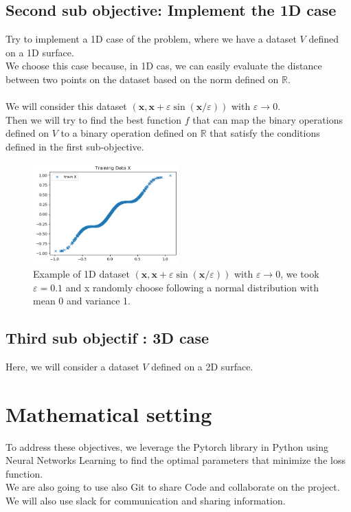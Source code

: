 \documentclass{report}
\begin{document}
        \subsection*{Second sub objective: Implement the 1D case}
            Try to implement a 1D case of the problem, where we have a dataset $V$ defined on a 1D surface.
            \\ 
            We choose this case because, in 1D cas, we can easily evaluate the distance between two points on the dataset based on the norm defined on $\mathbb{R}$.
            \\
            \\
            We will consider this dataset 
            $(\mathbf{x}, \mathbf{x}+\varepsilon \sin (\mathbf{x} / \varepsilon))$ with $\varepsilon \rightarrow 0$.
            \\
            Then we will try to find the best function $f$ that can map the binary operations defined on $V$ to a binary operation defined on $\mathbb{R}$ that satisfy the conditions defined in the first sub-objective.
            \newpage
            \begin{figure}
                \centering
                \includegraphics[width=0.5\textwidth]{./images/M.png}
                \caption{Example of 1D dataset  $(\mathbf{x}, \mathbf{x}+\varepsilon \sin (\mathbf{x} / \varepsilon))$ with $\varepsilon \rightarrow 0$, we took $\varepsilon = 0.1$ and x randomly choose following a normal distribution with mean 0 and variance 1.} 
            \end{figure}

        \subsection*{Third sub objectif : 3D case}
            Here, we will consider a dataset $V$ defined on a 2D surface.

        
\section{Mathematical setting}
    To address these objectives, we leverage
    the Pytorch library in Python using Neural Networks Learning to find the optimal parameters that minimize the loss function.\\
    We are also going to use also Git to share Code and collaborate on the project.\\ 
    We will also use slack for communication and sharing information.\\
\end{document}
